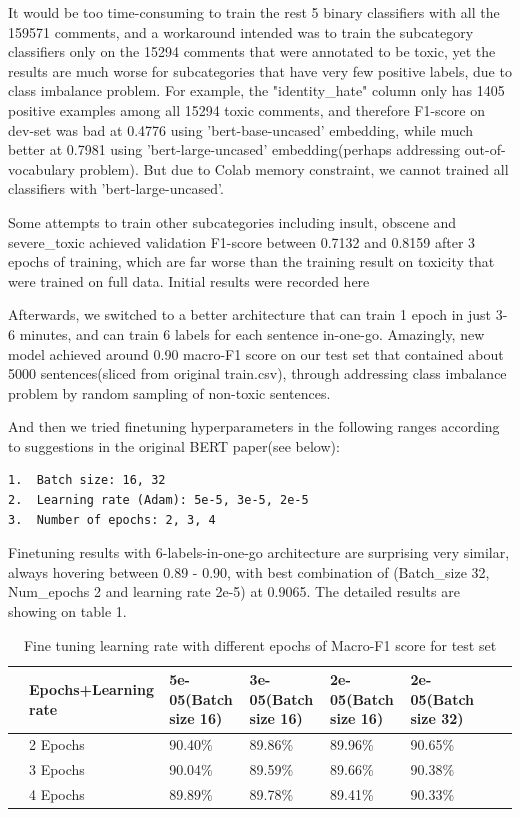 \documentclass[sigconf]{acmart}
\begin{document}
It would be too time-consuming to train the rest 5 binary classifiers with all the 159571 comments, and a workaround intended was to train the subcategory classifiers only on the 15294 comments that were annotated to be toxic, yet the results are much worse for subcategories that have very few positive labels, due to class imbalance problem. For example, the "identity\_hate" column only has 1405 positive examples among all 15294 toxic comments, and therefore F1-score on dev-set was bad at 0.4776 using 'bert-base-uncased' embedding, while much better at 0.7981 using 'bert-large-uncased' embedding(perhaps addressing out-of-vocabulary problem). But due to Colab memory constraint, we cannot trained all classifiers with 'bert-large-uncased'.

Some attempts to train other subcategories including insult, obscene and severe\_toxic achieved validation F1-score between 0.7132 and 0.8159 after 3 epochs of training, which are far worse than the training result on toxicity that were trained on full data. Initial results were recorded here

Afterwards, we switched to a better architecture that can train 1 epoch in just 3-6 minutes, and can train 6 labels for each sentence in-one-go. Amazingly, new model achieved around 0.90 macro-F1 score on our test set that contained about 5000 sentences(sliced from original train.csv), through addressing class imbalance problem by random sampling of non-toxic sentences.

And then we tried finetuning hyperparameters in the following ranges according to suggestions in the original BERT paper(see below):
\begin{lstlisting}
1.  Batch size: 16, 32
2.  Learning rate (Adam): 5e-5, 3e-5, 2e-5
3.  Number of epochs: 2, 3, 4
\end{lstlisting}

Finetuning results with 6-labels-in-one-go architecture are surprising very similar, always hovering between 0.89 - 0.90, with best combination of (Batch\_size 32, Num\_epochs 2 and learning rate 2e-5) at 0.9065. The detailed results are showing on table 1.

\begin{table}
	\caption {\label{tab:table1} Fine tuning learning rate with different epochs of Macro-F1 score for test set} 
	\centering
	\begin{tabular}{llllllll}
		\hline
		& Epochs+Learning rate  & 5e-05(Batch size 16)  &  3e-05(Batch size 16)  & 2e-05(Batch size 16) & 2e-05(Batch size 32) \\
		\hline
		& 2 Epochs & 90.40\% & 89.86\% & 89.96\% & 90.65\%   \\
		& 3 Epochs & 90.04\% & 89.59\% & 89.66\% & 90.38\%  \\
		& 4 Epochs & 89.89\% & 89.78\% & 89.41\% & 90.33\%   \\
		\hline
	\end{tabular}
\end{table}
\end{document}
